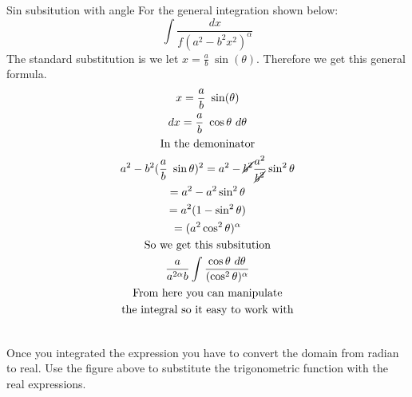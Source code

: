 \documentclass[letterpaper,10pt,twoside,twocolumn,openany]{book}
\begin{document}
\newpage
\begin{DndSidebar}[]{Sin subsitution with angle}
    For the general integration shown below:
    \begin{equation}
        \int \frac{dx}{f(a^2-b^2x^2)^\alpha}
    \end{equation}
    The standard substitution is we let $x = \frac{a}{b}\ \sin(\theta)$. Therefore we get this general formula.
    \begin{gather*}
        x = \frac{a}{b}\ \sin(\theta)\\
        dx =  \frac{a}{b}\ \cos\theta\ d\theta\\
        \text{In the demoninator}\\
        a^2 - b^2 (\frac{a}{b}\ \sin\theta)^2 = a^2 - \cancel{b^2} \frac{a^2}{\cancel{b^2}}\sin^2\theta\\
        = a^2 - a^2 \sin^2\theta\\
        = a^2(1 - \sin^2\theta)\\
        = (a^2 \cos^2\theta)^\alpha\\
        \text{So we get this subsitution}\\
        \frac{a}{a^{2\alpha}b} \int \frac{\cos\theta\ d\theta}{(\cos^2\theta)^\alpha}\\
        \text{From here you can manipulate}\\
        \text{the integral so it easy to work with}
    \end{gather*}

    \centering
    \\
    Once you integrated the expression you have to convert the domain from radian to real. Use the figure above to substitute the trigonometric function with the real expressions.
\end{DndSidebar}
\end{document}
